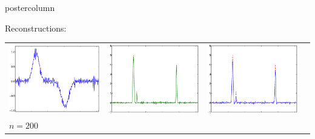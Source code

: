 \documentclass[final]{beamer}
\begin{document}
\begin{frame}
\begin{columns}
\begin{column}{.32\textwidth}
\begin{beamercolorbox}[center,wd=\textwidth]{postercolumn}
\begin{minipage}[T]{.95\textwidth}
{\begin{block}{Reconstructions:}
\begin{table}
\begin{tabular}{cccc}
                  \includegraphics[width=3.4in,trim=0 30 0 0,clip]{./figures/GCVsmooth200.eps} &
                  \includegraphics[width=3.4in,trim=0 30 0 0,clip]{./figures/minepeaked200.eps} &
                  \includegraphics[width=3.4in,trim=0 30 0 0,clip]{./figures/GCVpeaked30.eps} \\
                  \multicolumn{4}{l}{$n = 200$}  \\

\end{tabular}
\end{table}
\end{block}}
\end{minipage}
\end{beamercolorbox}
\end{column}
\end{columns}
\end{frame}
\end{document}
